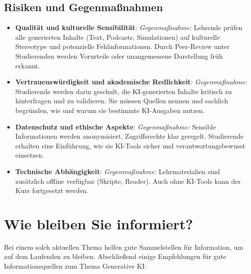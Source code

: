 \documentclass[
  ngerman,
  letterpaper,
  DIV=11]{scrreprt}
\providecommand{\tightlist}{%
  \setlength{\itemsep}{0pt}\setlength{\parskip}{0pt}}
\begin{document}
\subsection{Risiken und
Gegenmaßnahmen}\label{risiken-und-gegenmauxdfnahmen}

\begin{itemize}
\tightlist
\item
  \textbf{Qualität und kulturelle Sensibilität}: \emph{Gegenmaßnahme:}
  Lehrende prüfen alle generierten Inhalte (Text, Podcasts,
  Simulationen) auf kulturelle Stereotype und potenzielle
  Fehlinformationen. Durch Peer-Review unter Studierenden werden
  Vorurteile oder unangemessene Darstellung früh erkannt.
\item
  \textbf{Vertrauenswürdigkeit und akademische Redlichkeit}:
  \emph{Gegenmaßnahme:} Studierende werden darin geschult, die
  KI-generierten Inhalte kritisch zu hinterfragen und zu validieren. Sie
  müssen Quellen nennen und sachlich begründen, wie und warum sie
  bestimmte KI-Ausgaben nutzen.
\item
  \textbf{Datenschutz und ethische Aspekte}: \emph{Gegenmaßnahme:}
  Sensible Informationen werden anonymisiert, Zugriffsrechte klar
  geregelt. Studierende erhalten eine Einführung, wie sie KI-Tools
  sicher und verantwortungsbewusst einsetzen.
\item
  \textbf{Technische Abhängigkeit}: \emph{Gegenmaßnahme:}
  Lehrmaterialien sind zusätzlich offline verfügbar (Skripte, Reader).
  Auch ohne KI-Tools kann der Kurs fortgesetzt werden.
\end{itemize}

\section{Wie bleiben Sie informiert?}\label{wie-bleiben-sie-informiert}

Bei einem solch aktuellen Thema helfen gute Sammelstellen für
Information, um auf dem Laufenden zu bleiben. Abschließend einige
Empfehlungen für gute Informationsquellen zum Thema Generative KI:
\end{document}
